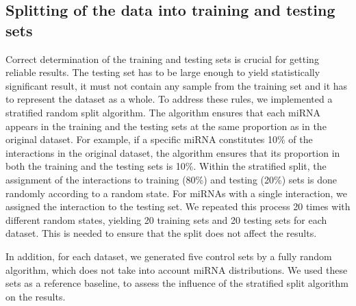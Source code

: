 \documentclass{bmcart}
\begin{document}
\subsection*{Splitting of the data into training and testing sets} \label{method:split}
Correct determination of the training and testing sets is crucial for getting reliable results. The testing set has to be large enough to yield statistically significant result, it must not contain any sample from the training set and it has to represent the dataset as a whole. 
To address these rules, we implemented a stratified random split algorithm. The algorithm ensures that each miRNA appears in the training and the testing sets at the same proportion as in the original dataset. For example, if a specific miRNA constitutes 10\% of the interactions in the original dataset, the algorithm ensures that its proportion in both the training and the testing sets is 10\%. Within the stratified split, the assignment of the interactions to training (80\%) and testing (20\%) sets is done randomly according to a random state. For miRNAs with a single interaction, we assigned the interaction to the testing set.
We repeated this process 20 times with different random states, yielding 20 training sets and 20 testing sets for each dataset. This is needed to ensure that the split does not affect the results.


In addition, for each dataset, we generated five control sets by a fully random algorithm, which does not take into account miRNA distributions. We used these sets as a reference baseline, to assess the influence of the stratified split algorithm on the results.

\end{document}
